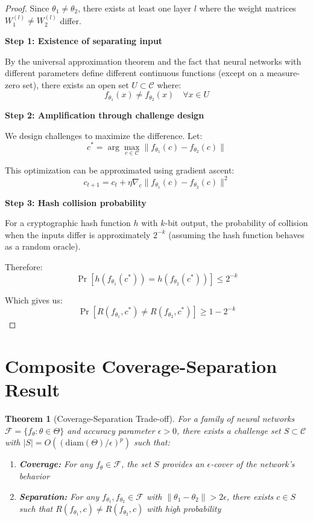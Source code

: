 \documentclass[11pt]{article}
\theoremstyle{plain}
\newtheorem{theorem}{Theorem}
\theoremstyle{definition}
\theoremstyle{remark}
\begin{document}
\begin{proof}
Since $\theta_1 \neq \theta_2$, there exists at least one layer $l$ where 
the weight matrices $W_1^{(l)} \neq W_2^{(l)}$ differ.

\textbf{Step 1: Existence of separating input}

By the universal approximation theorem and the fact that neural networks 
with different parameters define different continuous functions (except on 
a measure-zero set), there exists an open set $U \subset \mathcal{C}$ where:
$$f_{\theta_1}(x) \neq f_{\theta_2}(x) \quad \forall x \in U$$

\textbf{Step 2: Amplification through challenge design}

We design challenges to maximize the difference. Let:
$$c^* = \arg\max_{c \in \mathcal{C}} \|f_{\theta_1}(c) - f_{\theta_2}(c)\|$$

This optimization can be approximated using gradient ascent:
$$c_{t+1} = c_t + \eta \nabla_c \|f_{\theta_1}(c) - f_{\theta_2}(c)\|^2$$

\textbf{Step 3: Hash collision probability}

For a cryptographic hash function $h$ with $k$-bit output, the probability 
of collision when the inputs differ is approximately $2^{-k}$ (assuming the 
hash function behaves as a random oracle).

Therefore:
$$\Pr[h(f_{\theta_1}(c^*)) = h(f_{\theta_2}(c^*))] \leq 2^{-k}$$

Which gives us:
$$\Pr[R(f_{\theta_1}, c^*) \neq R(f_{\theta_2}, c^*)] \geq 1 - 2^{-k}$$
\end{proof}

\section{Composite Coverage-Separation Result}

\begin{theorem}[Coverage-Separation Trade-off]
\label{thm:coverage-separation}
For a family of neural networks $\mathcal{F} = \{f_\theta : \theta \in \Theta\}$ 
and accuracy parameter $\epsilon > 0$, there exists a challenge set 
$S \subset \mathcal{C}$ with $|S| = O((\text{diam}(\Theta)/\epsilon)^p)$ such that:
\begin{enumerate}
    \item \textbf{Coverage:} For any $f_\theta \in \mathcal{F}$, the set $S$ 
    provides an $\epsilon$-cover of the network's behavior
    \item \textbf{Separation:} For any $f_{\theta_1}, f_{\theta_2} \in \mathcal{F}$ 
    with $\|\theta_1 - \theta_2\| > 2\epsilon$, there exists $c \in S$ such that 
    $R(f_{\theta_1}, c) \neq R(f_{\theta_2}, c)$ with high probability
\end{enumerate}
\end{theorem}
\end{document}
